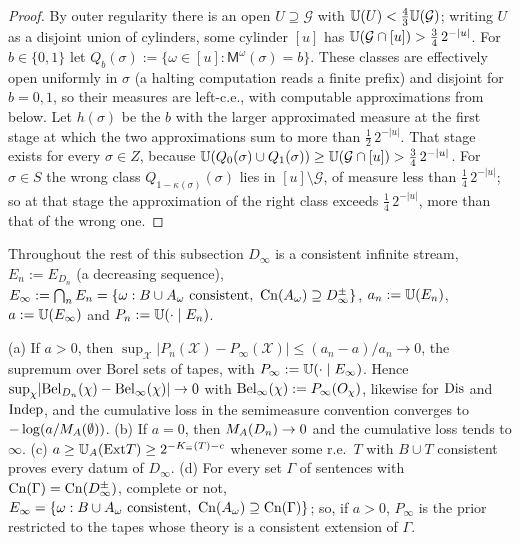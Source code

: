 \begin{proof}
By outer regularity there is an open $U\supseteq\mathcal G$ with $\mathbb{U}(U)<\frac43\mathbb{U}(\mathcal G)$; writing $U$ as a disjoint union of cylinders, some cylinder $[u]$ has $\mathbb{U}(\mathcal G\cap[u])>\frac34\,2^{-\lvert u\rvert}$. For $b\in\{0,1\}$ let $Q_b(\sigma):=\{\omega\in[u]:\mathsf M^\omega(\sigma)=b\}$. These classes are effectively open uniformly in $\sigma$ (a halting computation reads a finite prefix) and disjoint for $b=0,1$, so their measures are left-c.e., with computable approximations from below. Let $h(\sigma)$ be the $b$ with the larger approximated measure at the first stage at which the two approximations sum to more than $\frac12\,2^{-\lvert u\rvert}$. That stage exists for every $\sigma\in Z$, because $\mathbb{U}(Q_0(\sigma)\cup Q_1(\sigma))\ge\mathbb{U}(\mathcal G\cap[u])>\frac34\,2^{-\lvert u\rvert}$. For $\sigma\in S$ the wrong class $Q_{1-\kappa(\sigma)}(\sigma)$ lies in $[u]\setminus\mathcal G$, of measure less than $\frac14\,2^{-\lvert u\rvert}$; so at that stage the approximation of the right class exceeds $\frac14\,2^{-\lvert u\rvert}$, more than that of the wrong one.
\end{proof}

Throughout the rest of this subsection $D_\infty$ is a consistent infinite stream, $E_n:=E_{D_n}$ (a decreasing sequence), $E_\infty:=\bigcap_nE_n=\{\omega:B\cup A_\omega\text{ consistent},\ \mathrm{Cn}(A_\omega)\supseteq D_\infty^\pm\}$, $a_n:=\mathbb{U}(E_n)$, $a:=\mathbb{U}(E_\infty)$ and $P_n:=\mathbb{U}(\cdot\mid E_n)$.

\begin{proposition}\label{prop:basic:limitpost}
(a) If $a>0$, then $\sup_{\mathcal X}\lvert P_n(\mathcal X)-P_\infty(\mathcal X)\rvert\le(a_n-a)/a_n\to0$, the supremum over Borel sets of tapes, with $P_\infty:=\mathbb{U}(\cdot\mid E_\infty)$. Hence $\sup_\chi\lvert\mathrm{Bel}_{D_n}(\chi)-\mathrm{Bel}_\infty(\chi)\rvert\to0$ with $\mathrm{Bel}_\infty(\chi):=P_\infty(O_\chi)$, likewise for $\mathrm{Dis}$ and $\mathrm{Indep}$, and the cumulative loss in the semimeasure convention converges to $-\log(a/M_{A}(\emptyset))$.
(b) If $a=0$, then $M_{A}(D_n)\to0$ and the cumulative loss tends to $\infty$.
(c) $a\ge\mathbb{U}_{A}(\mathrm{Ext} T)\ge2^{-K_{\equiv}(T)-c}$ whenever some r.e.\ $T$ with $B\cup T$ consistent proves every datum of $D_\infty$.
(d) For every set $\Gamma$ of sentences with $\mathrm{Cn}(\Gamma)=\mathrm{Cn}(D_\infty^\pm)$, complete or not, $E_\infty=\{\omega:B\cup A_\omega\text{ consistent},\ \mathrm{Cn}(A_\omega)\supseteq\mathrm{Cn}(\Gamma)\}$; so, if $a>0$, $P_\infty$ is the prior restricted to the tapes whose theory is a consistent extension of $\Gamma$.
\end{proposition}

